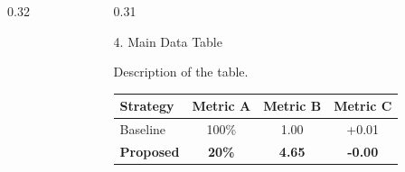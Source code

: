 \documentclass[final]{beamer}
\begin{document}
\begin{frame}{}
\begin{columns}[t]
\begin{column}{0.32\textwidth}
\end{column}

\begin{column}{0.31\textwidth}

\begin{block}{4. Main Data Table}
\begin{tcolorbox}[colback=green!5!white,colframe=green!50!black,title=\textbf{$\star$ Key Result Highlights},boxrule=1pt,top=2pt,bottom=2pt,left=4pt,right=4pt]
\scriptsize
Description of the table.

\vspace{0.3ex}
\begin{center}
\scriptsize
\renewcommand{\arraystretch}{0.85}
\begin{tabular}{lccc}
\toprule
\textbf{Strategy} & \textbf{Metric A} & \textbf{Metric B} & \textbf{Metric C} \\
\midrule
\rowcolor{gray!10} Baseline & 100\% & 1.00 & +0.01 \\
\rowcolor{orange!30} \textbf{Proposed} & \textbf{20\%} & \textbf{4.65} & \textbf{-0.00} \\
\bottomrule
\end{tabular}
\end{center}
\vspace{-0.5ex}\par{}
\end{tcolorbox}
\end{block}


\end{column}
\end{columns}
\end{frame}
\end{document}

